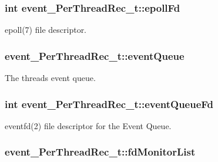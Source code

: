 \subsubsection[{\texorpdfstring{epoll\+Fd}{epollFd}}]{\setlength{\rightskip}{0pt plus 5cm}int event\+\_\+\+Per\+Thread\+Rec\+\_\+t\+::epoll\+Fd}\hypertarget{structevent___per_thread_rec__t_a509a7372744a3aede12c2e97d02ff8ad}{}\label{structevent___per_thread_rec__t_a509a7372744a3aede12c2e97d02ff8ad}


epoll(7) file descriptor. 

\subsubsection[{\texorpdfstring{event\+Queue}{eventQueue}}]{ event\+\_\+\+Per\+Thread\+Rec\+\_\+t\+::event\+Queue}\hypertarget{structevent___per_thread_rec__t_a12ca21b869f113ea2ab7536c439d98fb}{}\label{structevent___per_thread_rec__t_a12ca21b869f113ea2ab7536c439d98fb}


The thread\textquotesingle{}s event queue. 

\subsubsection[{\texorpdfstring{event\+Queue\+Fd}{eventQueueFd}}]{\setlength{\rightskip}{0pt plus 5cm}int event\+\_\+\+Per\+Thread\+Rec\+\_\+t\+::event\+Queue\+Fd}\hypertarget{structevent___per_thread_rec__t_ae0c369b884f17da9b57276cf7b446e4c}{}\label{structevent___per_thread_rec__t_ae0c369b884f17da9b57276cf7b446e4c}


eventfd(2) file descriptor for the Event Queue. 

\subsubsection[{\texorpdfstring{fd\+Monitor\+List}{fdMonitorList}}]{ event\+\_\+\+Per\+Thread\+Rec\+\_\+t\+::fd\+Monitor\+List}\hypertarget{structevent___per_thread_rec__t_a07268bec73747d8d6c2ef9178260b256}{}\label{structevent___per_thread_rec__t_a07268bec73747d8d6c2ef9178260b256}


